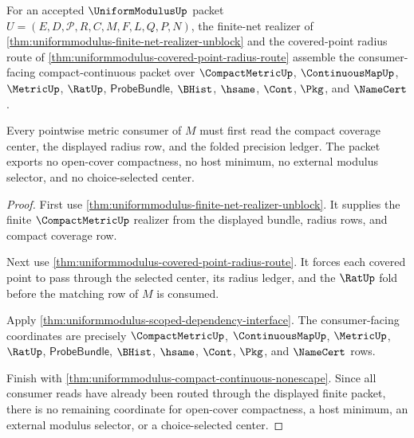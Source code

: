 \begin{theorem}
\label{thm:uniformmodulus-pointwise-metric-consumer-unblock}
For an accepted $\UniformModulusUp$ packet $U=(E,D,\mathcal{P},R,C,M,F,L,Q,P,N)$, the finite-net realizer of \autoref{thm:uniformmodulus-finite-net-realizer-unblock} and the covered-point radius route of \autoref{thm:uniformmodulus-covered-point-radius-route} assemble the consumer-facing compact-continuous packet over $\CompactMetricUp$, $\ContinuousMapUp$, $\MetricUp$, $\RatUp$, $\mathsf{ProbeBundle}$, $\BHist$, $\hsame$, $\Cont$, $\Pkg$, and $\NameCert$.

Every pointwise metric consumer of $M$ must first read the compact coverage center, the displayed radius row, and the folded precision ledger. The packet exports no open-cover compactness, no host minimum, no external modulus selector, and no choice-selected center.
\end{theorem}
\begin{proof}
First use \autoref{thm:uniformmodulus-finite-net-realizer-unblock}. It supplies the finite $\CompactMetricUp$ realizer from the displayed bundle, radius rows, and compact coverage row.

Next use \autoref{thm:uniformmodulus-covered-point-radius-route}. It forces each covered point to pass through the selected center, its radius ledger, and the $\RatUp$ fold before the matching row of $M$ is consumed.

Apply \autoref{thm:uniformmodulus-scoped-dependency-interface}. The consumer-facing coordinates are precisely $\CompactMetricUp$, $\ContinuousMapUp$, $\MetricUp$, $\RatUp$, $\mathsf{ProbeBundle}$, $\BHist$, $\hsame$, $\Cont$, $\Pkg$, and $\NameCert$ rows.

Finish with \autoref{thm:uniformmodulus-compact-continuous-nonescape}. Since all consumer reads have already been routed through the displayed finite packet, there is no remaining coordinate for open-cover compactness, a host minimum, an external modulus selector, or a choice-selected center.
\end{proof}

